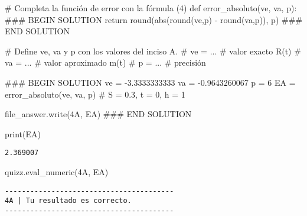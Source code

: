 \documentclass[
  letterpaper,
  DIV=11,
  numbers=noendperiod]{scrreprt}
\newenvironment{Shaded}{\begin{snugshade}}{\end{snugshade}}
\newcommand{\BuiltInTok}[1]{\textcolor[rgb]{0.00,0.23,0.31}{#1}}
\newcommand{\CommentTok}[1]{\textcolor[rgb]{0.37,0.37,0.37}{#1}}
\newcommand{\ControlFlowTok}[1]{\textcolor[rgb]{0.00,0.23,0.31}{#1}}
\newcommand{\DecValTok}[1]{\textcolor[rgb]{0.68,0.00,0.00}{#1}}
\newcommand{\FloatTok}[1]{\textcolor[rgb]{0.68,0.00,0.00}{#1}}
\newcommand{\KeywordTok}[1]{\textcolor[rgb]{0.00,0.23,0.31}{#1}}
\newcommand{\NormalTok}[1]{\textcolor[rgb]{0.00,0.23,0.31}{#1}}
\newcommand{\OperatorTok}[1]{\textcolor[rgb]{0.37,0.37,0.37}{#1}}
\newcommand{\RegionMarkerTok}[1]{\textcolor[rgb]{0.00,0.23,0.31}{#1}}
\newcommand{\StringTok}[1]{\textcolor[rgb]{0.13,0.47,0.30}{#1}}
\begin{document}
\begin{Shaded}
\begin{Highlighting}[]
\CommentTok{\# Completa la función de error con la fórmula (4)}
\KeywordTok{def}\NormalTok{ error\_absoluto(ve, va, p):}
    \CommentTok{\#\#\# }\RegionMarkerTok{BEGIN}\CommentTok{ SOLUTION}
    \ControlFlowTok{return} \BuiltInTok{round}\NormalTok{(}\BuiltInTok{abs}\NormalTok{(}\BuiltInTok{round}\NormalTok{(ve,p) }\OperatorTok{{-}} \BuiltInTok{round}\NormalTok{(va,p)), p)}
    \CommentTok{\#\#\# }\RegionMarkerTok{END}\CommentTok{ SOLUTION}
\end{Highlighting}
\end{Shaded}

\begin{Shaded}
\begin{Highlighting}[]
\CommentTok{\# Define ve, va y p con los valores del inciso A.}
\CommentTok{\# ve = ... \# valor exacto R\textquotesingle{}(t) }
\CommentTok{\# va = ... \# valor aproximado m(t)}
\CommentTok{\# p = ...  \# precisión}

\CommentTok{\#\#\# }\RegionMarkerTok{BEGIN}\CommentTok{ SOLUTION}
\NormalTok{ve }\OperatorTok{=} \OperatorTok{{-}}\FloatTok{3.3333333333}
\NormalTok{va }\OperatorTok{=} \OperatorTok{{-}}\FloatTok{0.9643260067}
\NormalTok{p }\OperatorTok{=} \DecValTok{6}
\NormalTok{EA }\OperatorTok{=}\NormalTok{ error\_absoluto(ve, va, p) }\CommentTok{\# S = 0.3, t = 0, h = 1}

\NormalTok{file\_answer.write(}\StringTok{\textquotesingle{}4A\textquotesingle{}}\NormalTok{, EA)}
\CommentTok{\#\#\# }\RegionMarkerTok{END}\CommentTok{ SOLUTION}

\BuiltInTok{print}\NormalTok{(EA)}
\end{Highlighting}
\end{Shaded}

\begin{verbatim}
2.369007
\end{verbatim}

\begin{Shaded}
\begin{Highlighting}[]
\NormalTok{quizz.eval\_numeric(}\StringTok{\textquotesingle{}4A\textquotesingle{}}\NormalTok{, EA)}
\end{Highlighting}
\end{Shaded}

\begin{verbatim}
----------------------------------------
4A | Tu resultado es correcto.
----------------------------------------
\end{verbatim}
\end{document}
